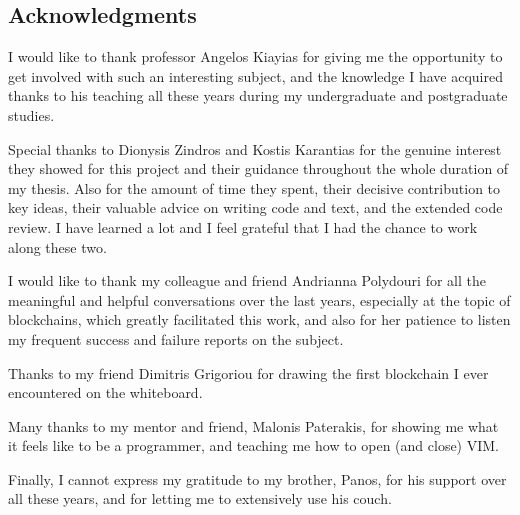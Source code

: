 \newpage
\begin{center}
    \section*{Acknowledgments}
\end{center}

I would like to thank professor Angelos Kiayias for giving me the opportunity
to get involved with such an interesting subject, and the knowledge I have
acquired thanks to his teaching all these years during my undergraduate and
postgraduate studies.

Special thanks to Dionysis Zindros and Kostis Karantias for the genuine
interest they showed for this project and their guidance throughout the whole
duration of my thesis. Also for the amount of time they spent, their decisive
contribution to key ideas, their valuable advice on writing code and text, and
the extended code review. I have learned a lot and I feel grateful that I had
the chance to work along these two.

I would like to thank my colleague and friend Andrianna Polydouri for all the
meaningful and helpful conversations over the last years, especially at the
topic of blockchains, which greatly facilitated this work, and also for her
patience to listen my frequent success and failure reports on the subject.

Thanks to my friend Dimitris Grigoriou for drawing the first blockchain I ever
encountered on the whiteboard.

Many thanks to my mentor and friend, Malonis Paterakis, for showing me
what it feels like to be a programmer, and teaching me how to open (and close)
VIM.

Finally, I cannot express my gratitude to my brother, Panos, for his support
over all these years, and for letting me to extensively use his couch.
